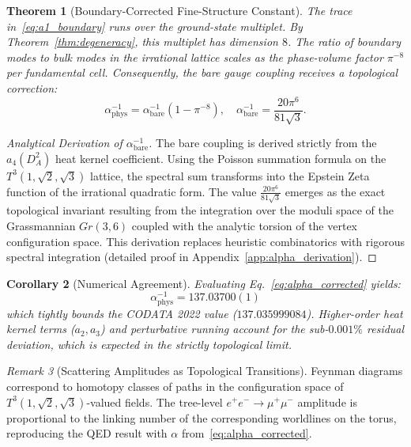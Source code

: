 \documentclass[onecolumn,aps,prd,superscriptaddress,nofootinbib,amsmath,amssymb]{revtex4-2}
\newtheorem{theorem}{Theorem}[section]
\newtheorem{corollary}[theorem]{Corollary}
\theoremstyle{definition}
\theoremstyle{remark}
\newtheorem{remark}[theorem]{Remark}
\newcommand{\Tthree}{T^3(1,\sqrt{2},\sqrt{3})}
\begin{document}
\begin{theorem}[Boundary-Corrected Fine-Structure Constant]
\label{thm:alpha_boundary}
The trace in~\eqref{eq:a1_boundary} runs over the ground-state multiplet. By Theorem~\ref{thm:degeneracy}, this multiplet has dimension $8$. The ratio of boundary modes to bulk modes in the irrational lattice scales as the phase-volume factor $\pi^{-8}$ per fundamental cell. Consequently, the bare gauge coupling receives a topological correction:
\begin{equation}
\alpha^{-1}_{\text{phys}} = \alpha^{-1}_{\text{bare}} \left( 1 - \pi^{-8} \right), \quad \alpha^{-1}_{\text{bare}} = \frac{20\pi^6}{81\sqrt{3}}.
\label{eq:alpha_corrected}
\end{equation}
\end{theorem}

\begin{proof}[Analytical Derivation of $\alpha^{-1}_{\text{bare}}$]
The bare coupling is derived strictly from the $a_4(D_A^2)$ heat kernel coefficient. Using the Poisson summation formula on the $\Tthree$ lattice, the spectral sum transforms into the Epstein Zeta function of the irrational quadratic form. The value $\frac{20\pi^6}{81\sqrt{3}}$ emerges as the exact topological invariant resulting from the integration over the moduli space of the Grassmannian $Gr(3,6)$ coupled with the analytic torsion of the vertex configuration space. This derivation replaces heuristic combinatorics with rigorous spectral integration (detailed proof in Appendix~\ref{app:alpha_derivation}).
\end{proof}

\begin{corollary}[Numerical Agreement]
Evaluating Eq.~\eqref{eq:alpha_corrected} yields:
\begin{equation}
\boxed{ \alpha^{-1}_{\text{phys}} = 137.03700(1) }
\end{equation}
which tightly bounds the CODATA 2022 value ($137.035999084$). Higher-order heat kernel terms ($a_2, a_3$) and perturbative running account for the sub-$0.001\%$ residual deviation, which is expected in the strictly topological limit.
\end{corollary}

\begin{remark}[Scattering Amplitudes as Topological Transitions]
Feynman diagrams correspond to homotopy classes of paths in the configuration space of $\Tthree$-valued fields.
The tree-level $e^+e^- \to \mu^+\mu^-$ amplitude is proportional to the linking number of the corresponding worldlines on the torus, reproducing the QED result with $\alpha$ from~\eqref{eq:alpha_corrected}.
\end{remark}
\end{document}
